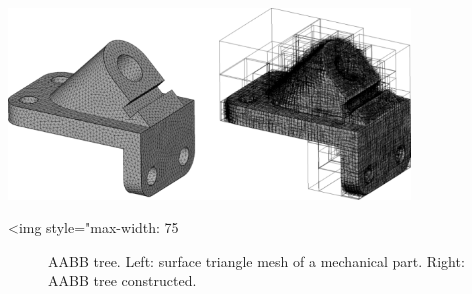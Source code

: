 \begin{center}
    \label{fig:AABB-tree-anchor}
    \begin{ccTexOnly}
      \includegraphics[width=0.8\textwidth]{AABB_tree/figs/anchor}
    \end{ccTexOnly}
    \begin{ccHtmlOnly}
    <img style="max-width: 75%
    \end{ccHtmlOnly}
    \begin{figure}[h]
        \caption{AABB tree.
                 Left: surface triangle mesh of a mechanical part.
                 Right: AABB tree constructed.}
    \end{figure}
\end{center}


	

